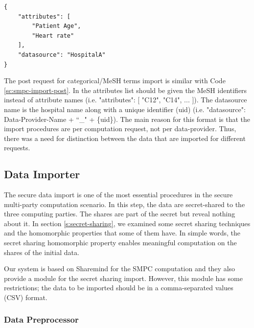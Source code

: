 {
\begin{verbatim}
{
    "attributes": [
        "Patient Age",
        "Heart rate"
    ],
    "datasource": "HospitalA"
}
\end{verbatim}
\label{sc:smpc-import-post}
}

The post request for categorical/MeSH terms import is similar with Code \ref{sc:smpc-import-post}.
In the attributes list should be given the MeSH identifiers instead of attribute names (i.e. "attributes": [ "C12", "C14", ... ]).
The datasource name is the hospital name along with a unique identifier (uid) (i.e. "datasource": Data-Provider-Name + ``\_" + \{uid\}).
The main reason for this format is that the import procedures are per computation request, not per data-provider.
Thus, there was a need for distinction between the data that are imported for different requests.


\subsection{Data Importer}\label{ss:data-providers-importer}
The secure data import is one of the most essential procedures in the secure multi-party computation scenario.
In this step, the data are secret-shared to the three computing parties.
The shares are part of the secret but reveal nothing about it.
In section \ref{s:secret-sharing}, we examined some secret sharing techniques and the homomorphic properties that some of them have.
In simple words, the secret sharing homomorphic property enables meaningful computation on the shares of the initial data.

Our system is based on Sharemind for the SMPC computation and they also provide a module for the secret sharing import.
However, this module has some restrictions; the data to be imported should be in a comma-separated values (CSV) format.



\subsubsection{Data Preprocessor}\label{sss:data-providers-preprocessor}





